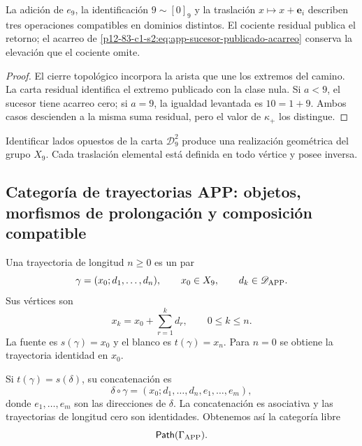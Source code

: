 \begin{lemma}
\label{p12-83-c1-s2:lem:app-compatibilidad-cierre-residuo}
La adición de \(e_9\), la identificación \(9\sim[0]_9\) y la traslación
\(x\mapsto x+\mathbf e_i\) describen tres operaciones compatibles en
dominios distintos. El cociente residual publica el retorno; el acarreo de
\cref{p12-83-c1-s2:eq:app-sucesor-publicado-acarreo} conserva la elevación que el
cociente omite.
\end{lemma}

\begin{proof}
El cierre topológico incorpora la arista que une los extremos del camino. La
carta residual identifica el extremo publicado con la clase nula. Si
\(a<9\), el sucesor tiene acarreo cero; si \(a=9\), la igualdad levantada
es \(10=1+9\). Ambos casos descienden a la misma suma residual, pero el
valor de \(\kappa_+\) los distingue.
\end{proof}

\begin{corollary}
\label{p12-83-c1-s2:cor:app-soporte-toroidal}
Identificar lados opuestos de la carta \(\mathcal D_9^2\) produce una
realización geométrica del grupo \(X_9\). Cada traslación elemental está
definida en todo vértice y posee inversa.
\end{corollary}

\subsection{Categoría de trayectorias APP: objetos, morfismos de prolongación y composición compatible}

\begin{definition}
Una trayectoria de longitud \(n\geq0\) es un par
\[
 \gamma=(x_0;d_1,\ldots,d_n),
 \qquad
 x_0\in X_9,\qquad d_k\in\mathscr D_{\rm APP}.
\]
Sus vértices son
\[
 x_k=x_0+\sum_{r=1}^k d_r,
 \qquad 0\leq k\leq n.
\]
La fuente es \(s(\gamma)=x_0\) y el blanco es
\(t(\gamma)=x_n\). Para \(n=0\) se obtiene la trayectoria identidad en
\(x_0\).
\end{definition}

Si \(t(\gamma)=s(\delta)\), su concatenación es
\[
 \delta\circ\gamma
  =(x_0;d_1,\ldots,d_n,e_1,\ldots,e_m),
\]
donde \(e_1,\ldots,e_m\) son las direcciones de \(\delta\). La
concatenación es asociativa y las trayectorias de longitud cero son
identidades. Obtenemos así la categoría libre
\[
 \mathsf{Path}(\Gamma_{\rm APP}).
\]

